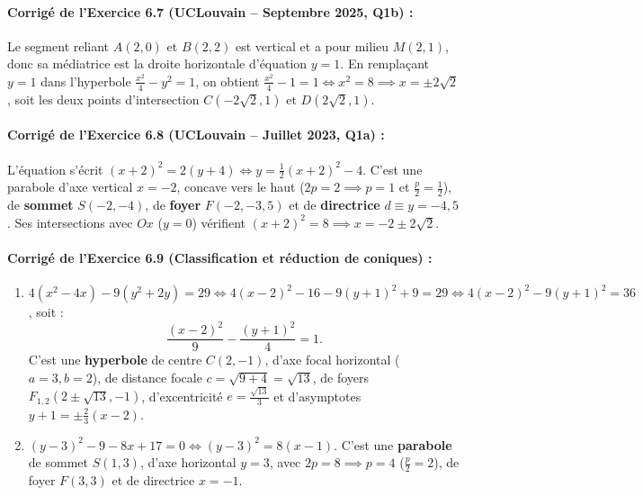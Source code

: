 \paragraph{Corrigé de l'Exercice 6.7 (UCLouvain -- Septembre 2025, Q1b) :}
Le segment reliant $A(2,0)$ et $B(2,2)$ est vertical et a pour milieu $M(2,1)$, donc sa médiatrice est la droite horizontale d'équation $\boxed{y = 1}$. En remplaçant $y = 1$ dans l'hyperbole $\frac{x^2}{4} - y^2 = 1$, on obtient $\frac{x^2}{4} - 1 = 1 \iff x^2 = 8 \implies x = \pm 2\sqrt{2}$, soit les deux points d'intersection $\boxed{C(-2\sqrt{2}, 1) \text{ et } D(2\sqrt{2}, 1)}$.

\paragraph{Corrigé de l'Exercice 6.8 (UCLouvain -- Juillet 2023, Q1a) :}
L'équation s'écrit $(x+2)^2 = 2(y+4) \iff y = \frac{1}{2}(x+2)^2 - 4$. C'est une parabole d'axe vertical $x = -2$, concave vers le haut ($2p = 2 \implies p = 1$ et $\frac{p}{2} = \frac{1}{2}$), de \textbf{sommet} $\boxed{S(-2, -4)}$, de \textbf{foyer} $\boxed{F(-2, -3,5)}$ et de \textbf{directrice} $\boxed{d \equiv y = -4,5}$. Ses intersections avec $Ox$ ($y=0$) vérifient $(x+2)^2 = 8 \implies \boxed{x = -2 \pm 2\sqrt{2}}$.

\paragraph{Corrigé de l'Exercice 6.9 (Classification et réduction de coniques) :}
\begin{enumerate}[label=(\alph*)]
    \item $4(x^2-4x) - 9(y^2+2y) = 29 \iff 4(x-2)^2 - 16 - 9(y+1)^2 + 9 = 29 \iff 4(x-2)^2 - 9(y+1)^2 = 36$, soit :
    \[
        \boxed{\frac{(x-2)^2}{9} - \frac{(y+1)^2}{4} = 1}.
    \]
    C'est une \textbf{hyperbole} de centre $C(2, -1)$, d'axe focal horizontal ($a=3, b=2$), de distance focale $c = \sqrt{9+4} = \sqrt{13}$, de foyers $F_{1,2}(2 \pm \sqrt{13}, -1)$, d'excentricité $e = \frac{\sqrt{13}}{3}$ et d'asymptotes $y + 1 = \pm \frac{2}{3}(x-2)$.
    \item $(y-3)^2 - 9 - 8x + 17 = 0 \iff \boxed{(y-3)^2 = 8(x-1)}$. C'est une \textbf{parabole} de sommet $S(1, 3)$, d'axe horizontal $y = 3$, avec $2p = 8 \implies p = 4$ ($\frac{p}{2} = 2$), de foyer $F(3, 3)$ et de directrice $x = -1$.
\end{enumerate}

